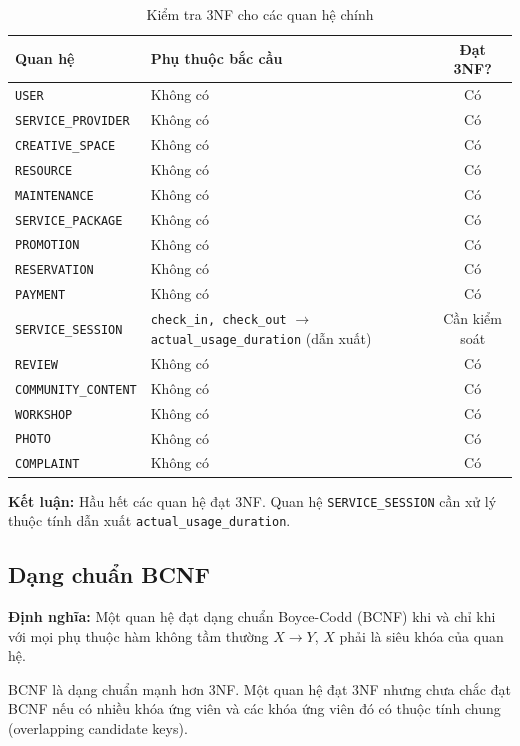 \begin{table}[htbp]
\centering
\begin{tabularx}{\linewidth}{|l|X|c|}
\hline
\textbf{Quan hệ} & \textbf{Phụ thuộc bắc cầu} & \textbf{Đạt 3NF?} \\
\hline
\texttt{USER} & Không có & Có \\
\hline
\texttt{SERVICE\_PROVIDER} & Không có & Có \\
\hline
\texttt{CREATIVE\_SPACE} & Không có & Có \\
\hline
\texttt{RESOURCE} & Không có & Có \\
\hline
\texttt{MAINTENANCE} & Không có & Có \\
\hline
\texttt{SERVICE\_PACKAGE} & Không có & Có \\
\hline
\texttt{PROMOTION} & Không có & Có \\
\hline
\texttt{RESERVATION} & Không có & Có \\
\hline
\texttt{PAYMENT} & Không có & Có \\
\hline
\texttt{SERVICE\_SESSION} & \texttt{check\_in, check\_out} $\rightarrow$ \texttt{actual\_usage\_duration} (dẫn xuất) & Cần kiểm soát \\
\hline
\texttt{REVIEW} & Không có & Có \\
\hline
\texttt{COMMUNITY\_CONTENT} & Không có & Có \\
\hline
\texttt{WORKSHOP} & Không có & Có \\
\hline
\texttt{PHOTO} & Không có & Có \\
\hline
\texttt{COMPLAINT} & Không có & Có \\
\hline
\end{tabularx}
\caption{Kiểm tra 3NF cho các quan hệ chính}
\end{table}

\textbf{Kết luận:} Hầu hết các quan hệ đạt 3NF. Quan hệ \texttt{SERVICE\_SESSION} cần xử lý thuộc tính dẫn xuất \texttt{actual\_usage\_duration}.

\subsection{Dạng chuẩn BCNF}

\textbf{Định nghĩa:} Một quan hệ đạt dạng chuẩn Boyce-Codd (BCNF) khi và chỉ khi với mọi phụ thuộc hàm không tầm thường $X \rightarrow Y$, $X$ phải là siêu khóa của quan hệ.

BCNF là dạng chuẩn mạnh hơn 3NF. Một quan hệ đạt 3NF nhưng chưa chắc đạt BCNF nếu có nhiều khóa ứng viên và các khóa ứng viên đó có thuộc tính chung (overlapping candidate keys).

